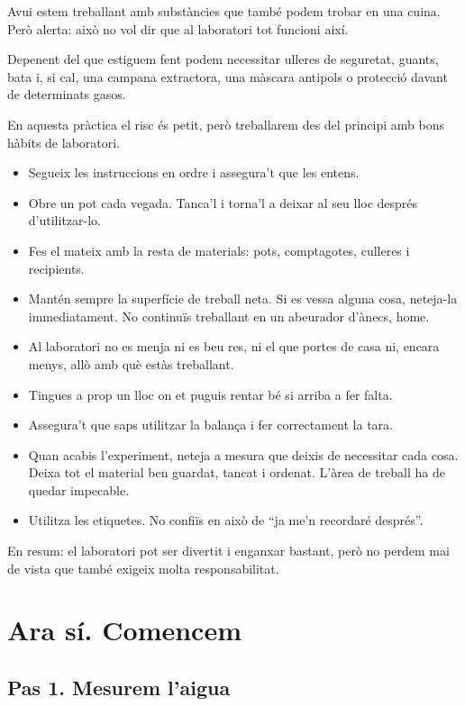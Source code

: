 Avui estem treballant amb substàncies que també podem trobar en una cuina. Però alerta: això no vol dir que al laboratori tot funcioni així.

Depenent del que estiguem fent podem necessitar ulleres de seguretat, guants, bata i, si cal, una campana extractora, una màscara antipols o protecció davant de determinats gasos.

En aquesta pràctica el risc és petit, però treballarem des del principi amb bons hàbits de laboratori.

\begin{itemize}
    \item Segueix les instruccions en ordre i assegura't que les entens.
    \item Obre un pot cada vegada. Tanca'l i torna'l a deixar al seu lloc després d'utilitzar-lo.
    \item Fes el mateix amb la resta de materials: pots, comptagotes, culleres i recipients.
    \item Mantén sempre la superfície de treball neta. Si es vessa alguna cosa, neteja-la immediatament. No continuïs treballant en un abeurador d'ànecs, home.
    \item Al laboratori no es menja ni es beu res, ni el que portes de casa ni, encara menys, allò amb què estàs treballant.
    \item Tingues a prop un lloc on et puguis rentar bé si arriba a fer falta.
    \item Assegura't que saps utilitzar la balança i fer correctament la tara.
    \item Quan acabis l'experiment, neteja a mesura que deixis de necessitar cada cosa. Deixa tot el material ben guardat, tancat i ordenat. L'àrea de treball ha de quedar impecable.
    \item Utilitza les etiquetes. No confiïs en això de ``ja me'n recordaré després''.
\end{itemize}

En resum: el laboratori pot ser divertit i enganxar bastant, però no perdem mai de vista que també exigeix molta responsabilitat.

\section{Ara sí. Comencem}

\subsection{Pas 1. Mesurem l'aigua}

